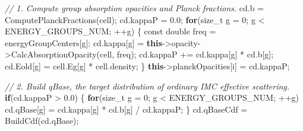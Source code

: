 \documentclass[
]{article}
\newenvironment{Shaded}{}{}
\newcommand{\AttributeTok}[1]{\textcolor[rgb]{0.49,0.56,0.16}{#1}}
\newcommand{\CommentTok}[1]{\textcolor[rgb]{0.38,0.63,0.69}{\textit{#1}}}
\newcommand{\ControlFlowTok}[1]{\textcolor[rgb]{0.00,0.44,0.13}{\textbf{#1}}}
\newcommand{\DataTypeTok}[1]{\textcolor[rgb]{0.56,0.13,0.00}{#1}}
\newcommand{\DecValTok}[1]{\textcolor[rgb]{0.25,0.63,0.44}{#1}}
\newcommand{\FloatTok}[1]{\textcolor[rgb]{0.25,0.63,0.44}{#1}}
\newcommand{\KeywordTok}[1]{\textcolor[rgb]{0.00,0.44,0.13}{\textbf{#1}}}
\newcommand{\NormalTok}[1]{#1}
\newcommand{\OperatorTok}[1]{\textcolor[rgb]{0.40,0.40,0.40}{#1}}
\begin{document}
\begin{Shaded}
\begin{Highlighting}[]
        \CommentTok{// 1. Compute group absorption opacities and Planck fractions.}
\NormalTok{        cd}\OperatorTok{.}\NormalTok{b }\OperatorTok{=}\NormalTok{ ComputePlanckFractions}\OperatorTok{(}\NormalTok{cell}\OperatorTok{);}
\NormalTok{        cd}\OperatorTok{.}\NormalTok{kappaP }\OperatorTok{=} \FloatTok{0.0}\OperatorTok{;}
        \ControlFlowTok{for}\OperatorTok{(}\DataTypeTok{size\_t}\NormalTok{ g }\OperatorTok{=} \DecValTok{0}\OperatorTok{;}\NormalTok{ g }\OperatorTok{\textless{}}\NormalTok{ ENERGY\_GROUPS\_NUM}\OperatorTok{;} \OperatorTok{++}\NormalTok{g}\OperatorTok{)}
        \OperatorTok{\{}
            \AttributeTok{const} \DataTypeTok{double}\NormalTok{ freq }\OperatorTok{=}\NormalTok{ energyGroupCenters}\OperatorTok{[}\NormalTok{g}\OperatorTok{];}
\NormalTok{            cd}\OperatorTok{.}\NormalTok{kappa}\OperatorTok{[}\NormalTok{g}\OperatorTok{]} \OperatorTok{=} \KeywordTok{this}\OperatorTok{{-}\textgreater{}}\NormalTok{opacity}\OperatorTok{{-}\textgreater{}}\NormalTok{CalcAbsorptionOpacity}\OperatorTok{(}\NormalTok{cell}\OperatorTok{,}\NormalTok{ freq}\OperatorTok{);}
\NormalTok{            cd}\OperatorTok{.}\NormalTok{kappaP }\OperatorTok{+=}\NormalTok{ cd}\OperatorTok{.}\NormalTok{kappa}\OperatorTok{[}\NormalTok{g}\OperatorTok{]} \OperatorTok{*}\NormalTok{ cd}\OperatorTok{.}\NormalTok{b}\OperatorTok{[}\NormalTok{g}\OperatorTok{];}
\NormalTok{            cd}\OperatorTok{.}\NormalTok{Eold}\OperatorTok{[}\NormalTok{g}\OperatorTok{]} \OperatorTok{=}\NormalTok{ cell}\OperatorTok{.}\NormalTok{Eg}\OperatorTok{[}\NormalTok{g}\OperatorTok{]} \OperatorTok{*}\NormalTok{ cell}\OperatorTok{.}\NormalTok{density}\OperatorTok{;}
        \OperatorTok{\}}
        \KeywordTok{this}\OperatorTok{{-}\textgreater{}}\NormalTok{planckOpacities}\OperatorTok{[}\NormalTok{i}\OperatorTok{]} \OperatorTok{=}\NormalTok{ cd}\OperatorTok{.}\NormalTok{kappaP}\OperatorTok{;}

        \CommentTok{// 2. Build qBase, the target distribution of ordinary IMC effective scattering.}
        \ControlFlowTok{if}\OperatorTok{(}\NormalTok{cd}\OperatorTok{.}\NormalTok{kappaP }\OperatorTok{\textgreater{}} \FloatTok{0.0}\OperatorTok{)}
        \OperatorTok{\{}
            \ControlFlowTok{for}\OperatorTok{(}\DataTypeTok{size\_t}\NormalTok{ g }\OperatorTok{=} \DecValTok{0}\OperatorTok{;}\NormalTok{ g }\OperatorTok{\textless{}}\NormalTok{ ENERGY\_GROUPS\_NUM}\OperatorTok{;} \OperatorTok{++}\NormalTok{g}\OperatorTok{)}
\NormalTok{                cd}\OperatorTok{.}\NormalTok{qBase}\OperatorTok{[}\NormalTok{g}\OperatorTok{]} \OperatorTok{=}\NormalTok{ cd}\OperatorTok{.}\NormalTok{kappa}\OperatorTok{[}\NormalTok{g}\OperatorTok{]} \OperatorTok{*}\NormalTok{ cd}\OperatorTok{.}\NormalTok{b}\OperatorTok{[}\NormalTok{g}\OperatorTok{]} \OperatorTok{/}\NormalTok{ cd}\OperatorTok{.}\NormalTok{kappaP}\OperatorTok{;}
        \OperatorTok{\}}
\NormalTok{        cd}\OperatorTok{.}\NormalTok{qBaseCdf }\OperatorTok{=}\NormalTok{ BuildCdf}\OperatorTok{(}\NormalTok{cd}\OperatorTok{.}\NormalTok{qBase}\OperatorTok{);}


\end{Highlighting}
\end{Shaded}
\end{document}
